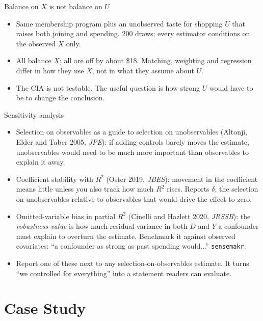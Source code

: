 \documentclass[aspectratio=169,11pt]{beamer}
\begin{document}
\begin{frame}{Balance on $X$ is not balance on $U$}
\begin{center}

\end{center}
\medskip
\begin{itemize}
\item Same membership program plus an unobserved taste for shopping $U$ that raises both joining and spending.
200 draws; every estimator conditions on the observed $X$ only.
\item All balance $X$; all are off by about \$18. Matching, weighting and regression differ in how they use $X$, not
in what they assume about $U$.
\item The CIA is not testable. The useful question is how strong $U$ would have to be to change the conclusion.
\end{itemize}
\end{frame}


\begin{frame}{Sensitivity analysis}
\begin{itemize}
\item \alert{Selection on observables as a guide to selection on unobservables} (Altonji, Elder and Taber 2005,
\emph{JPE}): if adding controls barely moves the estimate, unobservables would need to be much more important than
observables to explain it away.
\medskip
\item \alert{Coefficient stability with $R^2$} (Oster 2019, \emph{JBES}): movement in the coefficient means little
unless you also track how much $R^2$ rises. Reports $\delta$, the selection on unobservables relative to observables
that would drive the effect to zero.
\medskip
\item \alert{Omitted-variable bias in partial $R^2$} (Cinelli and Hazlett 2020, \emph{JRSSB}): the \emph{robustness
value} is how much residual variance in both $D$ and $Y$ a confounder must explain to overturn the estimate.
Benchmark it against observed covariates: ``a confounder as strong as past spending would...'' \texttt{sensemakr}.
\medskip
\item Report one of these next to any selection-on-observables estimate. It turns ``we controlled for everything''
into a statement readers can evaluate.
\end{itemize}
\end{frame}


\section{Case Study}
\end{document}
